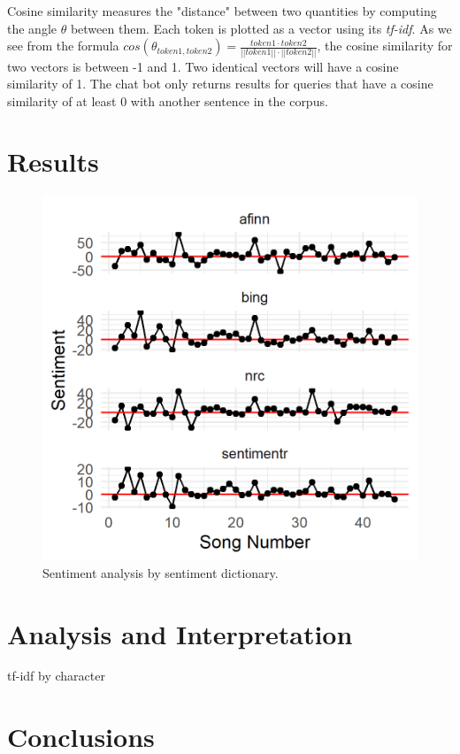 \documentclass{article}
\begin{document}
Cosine similarity measures the "distance" between two quantities by computing the angle $\theta$ between them. Each token is plotted as a vector using its \emph{tf-idf}. As we see from the formula $cos(\theta_{token1, token2}) = \frac {token1 \cdot token2}{||token1|| \cdot ||token2||}$, the cosine similarity for two vectors is between -1 and 1. Two identical vectors will have a cosine similarity of 1. The chat bot only returns results for queries that have a cosine similarity of at least 0 with another sentence in the corpus. 


\section{Results}

\begin{figure}[h]
    \caption{Sentiment analysis by sentiment dictionary. \label{fig:sentiment}}
    \centering
    \includegraphics[width=0.2\paperwidth]{sentiment_by_stopwords.png}
\end{figure}



\section{Analysis and Interpretation}

\begin{table}
\caption{tf-idf by character}
\label{tab:tfidf}

\end{table}

\section{Conclusions}



\end{document}
